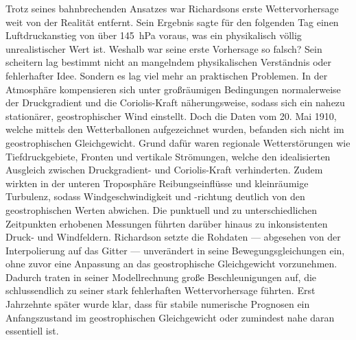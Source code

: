 Trotz seines bahnbrechenden Ansatzes war Richardsons erste Wettervorhersage weit von der Realität entfernt. 
Sein Ergebnis sagte für den folgenden Tag einen Luftdruckanstieg von über \SI{145}{\hecto\pascal} voraus, was ein physikalisch völlig unrealistischer Wert ist. 
Weshalb war seine erste Vorhersage so falsch? 
Sein scheitern lag bestimmt nicht an mangelndem physikalischen Verständnis oder fehlerhafter Idee. 
Sondern es lag viel mehr an praktischen Problemen.
In der Atmosphäre kompensieren sich unter großräumigen Bedingungen normalerweise der Druckgradient und die Coriolis-Kraft näherungsweise, sodass sich ein nahezu stationärer, geostrophischer Wind einstellt.
Doch die Daten vom 20. Mai 1910, welche mittels den Wetterballonen aufgezeichnet wurden, befanden sich nicht im geostrophischen Gleichgewicht.
Grund dafür waren regionale Wetterstörungen wie Tiefdruckgebiete, Fronten und vertikale Strömungen, welche den idealisierten Ausgleich zwischen Druckgradient- und Coriolis-Kraft verhinderten.
%
%
Zudem wirkten in der unteren Troposphäre Reibungseinflüsse und kleinräumige Turbulenz, sodass Windgeschwindigkeit und -richtung deutlich von den geostrophischen Werten abwichen.
%
%
Die punktuell und zu unterschiedlichen Zeitpunkten erhobenen Messungen führten darüber hinaus zu inkonsistenten Druck- und Windfeldern.
Richardson setzte die Rohdaten --- abgesehen von der Interpolierung auf das Gitter --- unverändert in seine Bewegungsgleichungen ein, ohne zuvor eine Anpassung an das geostrophische Gleichgewicht vorzunehmen.
Dadurch traten in seiner Modellrechnung große Beschleunigungen auf, die schlussendlich zu seiner stark fehlerhaften Wettervorhersage führten.
Erst Jahrzehnte später wurde klar, dass für stabile numerische Prognosen ein Anfangszustand im geostrophischen Gleichgewicht oder zumindest nahe daran essentiell ist.


 



